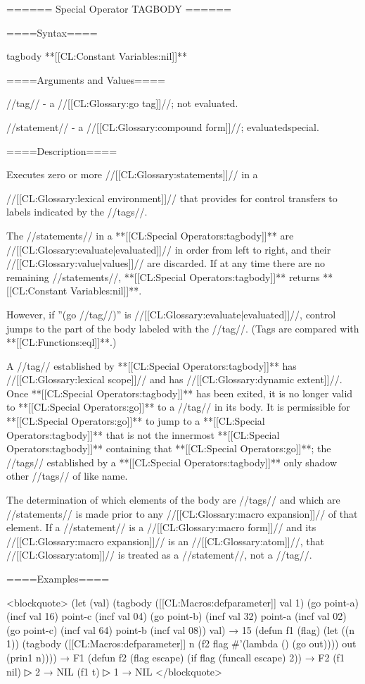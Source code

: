 ====== Special Operator TAGBODY ======

====Syntax====

\DefspecWithValues tagbody {} {**[[CL:Constant Variables:nil]]**}

====Arguments and Values====

//tag// - a //[[CL:Glossary:go tag]]//; not evaluated.

//statement// - a //[[CL:Glossary:compound form]]//; evaluatedspecial.

====Description====

Executes zero or more //[[CL:Glossary:statements]]// in a

//[[CL:Glossary:lexical environment]]// that provides for control transfers to labels indicated by the //tags//.

The //statements// in a **[[CL:Special Operators:tagbody]]** are //[[CL:Glossary:evaluate|evaluated]]// in order from left to right, and their //[[CL:Glossary:value|values]]// are discarded. If at any time there are no remaining //statements//, **[[CL:Special Operators:tagbody]]** returns **[[CL:Constant Variables:nil]]**.

However, if ''(go //tag//)'' is //[[CL:Glossary:evaluate|evaluated]]//, control jumps to the part of the body labeled with the //tag//. (Tags are compared with **[[CL:Functions:eql]]**.)

A //tag// established by **[[CL:Special Operators:tagbody]]** has //[[CL:Glossary:lexical scope]]// and has //[[CL:Glossary:dynamic extent]]//. Once **[[CL:Special Operators:tagbody]]** has been exited, it is no longer valid to **[[CL:Special Operators:go]]** to a //tag// in its body. It is permissible for **[[CL:Special Operators:go]]** to jump to a **[[CL:Special Operators:tagbody]]** that is not the innermost **[[CL:Special Operators:tagbody]]** containing that **[[CL:Special Operators:go]]**; the //tags// established by a **[[CL:Special Operators:tagbody]]** only shadow other //tags// of like name.

The determination of which elements of the body are //tags// and which are //statements// is made prior to any //[[CL:Glossary:macro expansion]]// of that element. If a //statement// is a //[[CL:Glossary:macro form]]// and its //[[CL:Glossary:macro expansion]]// is an //[[CL:Glossary:atom]]//, that //[[CL:Glossary:atom]]// is treated as a //statement//, not a //tag//.

====Examples====

<blockquote> (let (val) (tagbody ([[CL:Macros:defparameter]] val 1) (go point-a) (incf val 16) point-c (incf val 04) (go point-b) (incf val 32) point-a (incf val 02) (go point-c) (incf val 64) point-b (incf val 08)) val) → 15 (defun f1 (flag) (let ((n 1)) (tagbody ([[CL:Macros:defparameter]] n (f2 flag #'(lambda () (go out)))) out (prin1 n)))) → F1 (defun f2 (flag escape) (if flag (funcall escape) 2)) → F2 (f1 nil)
▷ 2 → NIL (f1 t)
▷ 1 → NIL </blockquote>

